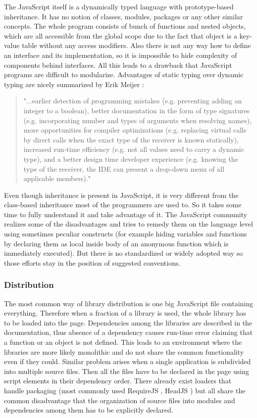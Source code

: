\documentclass[12pt,a4paper]{report}
\begin{document}
The JavaScript itself is a dynamically typed language with prototype-based inheritance. It has no notion of classes, modules, packages or any other similar concepts. The whole program consists of bunch of functions and nested objects, which are all accessible from the global scope due to the fact that object is a key-value table without any access modifiers. Also there is not any way how to define an interface and its implementation, so it is impossible to hide complexity of components behind interfaces. All this leads to a drawback that JavaScript programs are difficult to modularize. Advantages of static typing over dynamic typing are nicely summarized by Erik Meijer \cite{Meijer}: 

\begin{quote}
"...earlier detection of programming mistakes (e.g. preventing adding an integer to a boolean), better documentation in the form of type signatures (e.g. incorporating number and types of arguments when resolving names), more opportunities for compiler optimizations (e.g. replacing virtual calls by direct calls when the exact type of the receiver is known statically), increased run-time efficiency (e.g. not all values need to carry a dynamic type), and a better design time developer experience (e.g. knowing the type of the receiver, the IDE can present a drop-down menu of all applicable members)."
\end{quote}

Even though inheritance is present in JavaScript, it is very different from the class-based inheritance most of the programmers are used to. So it takes some time to fully understand it and take advantage of it. The JavaScript community realizes some of the disadvantages and tries to remedy them on the language level using sometimes peculiar constructs (for example hiding variables and functions by declaring them as local inside body of an anonymous function which is immediately executed). But there is no standardized or widely adopted way so those efforts stay in the position of suggested conventions.

\subsubsection*{Distribution} 

The most common way of library distribution is one big JavaScript file containing everything. Therefore when a fraction of a library is used, the whole library has to be loaded into the page. Dependencies among the libraries are described in the documentation, thus absence of a dependency causes run-time error claiming that a function or an object is not defined. This leads to an environment where the libraries are more likely monolithic and do not share the common functionality even if they could. Similar problem arises when a single application is subdivided into multiple source files. Then all the files have to be declared in the page using script elements in their dependency order. There already exist loaders that handle packaging (most commonly used RequireJS \cite{RequireJs}, HeadJS \cite{HeadJs}) but all share the common disadvantage that the organization of source files into modules and dependencies among them has to be explicitly declared.
\end{document}
